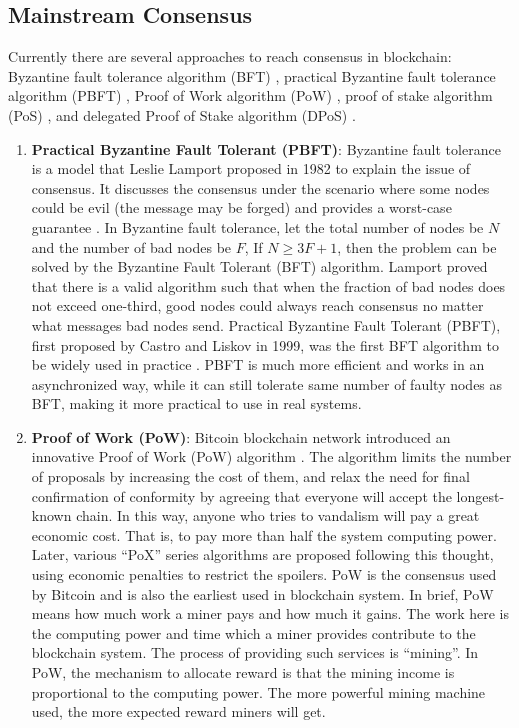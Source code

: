 \documentclass[reprint,pre,aps]{revtex4-1}
\begin{document}
\subsection{Mainstream Consensus}

Currently there are several approaches to reach consensus in blockchain: Byzantine fault tolerance algorithm (BFT) \cite{lamport1982byzantine}, practical Byzantine fault tolerance algorithm (PBFT) \cite{castro2002practical}, Proof of Work algorithm (PoW) \cite{nakamoto2008bitcoin}, proof of stake algorithm (PoS) \cite{vasin2014blackcoin, king2012ppcoin}, and delegated Proof of Stake algorithm (DPoS) \cite{dpos}.

\begin{enumerate}
\item \textbf{Practical Byzantine Fault Tolerant (PBFT)}: Byzantine fault tolerance is a model that Leslie Lamport proposed in 1982 to explain the issue of consensus. It discusses the consensus under the scenario where some nodes could be evil (the message may be forged) and provides a worst-case guarantee \cite{lamport1982byzantine}. In Byzantine fault tolerance, let the total number of nodes be $N$ and the number of bad nodes be $F$, If $N \geq 3F + 1$, then the problem can be solved by the Byzantine Fault Tolerant (BFT) algorithm. Lamport proved that there is a valid algorithm such that when the fraction of bad nodes does not exceed one-third, good nodes could always reach consensus no matter what messages bad nodes send. Practical Byzantine Fault Tolerant (PBFT), first proposed by Castro and Liskov in 1999, was the first BFT algorithm to be widely used in practice \cite{castro2002practical}. PBFT is much more efficient and works in an asynchronized way, while it can still tolerate same number of faulty nodes as BFT, making it more practical to use in real systems.
\item \textbf{Proof of Work (PoW)}: Bitcoin blockchain network introduced an innovative Proof of Work (PoW) algorithm \cite{nakamoto2008bitcoin}. The algorithm limits the number of proposals by increasing the cost of them, and relax the need for final confirmation of conformity by agreeing that everyone will accept the longest-known chain. In this way, anyone who tries to vandalism will pay a great economic cost. That is, to pay more than half the system computing power. Later, various ``PoX'' series algorithms are proposed following this thought, using economic penalties to restrict the spoilers. PoW is the consensus used by Bitcoin and is also the earliest used in blockchain system. In brief, PoW means how much work a miner pays and how much it gains. The work here is the computing power and time which a miner provides contribute to the blockchain system. The process of providing such services is ``mining''. In PoW, the mechanism to allocate reward is that the mining income is proportional to the computing power. The more powerful mining machine used, the more expected reward miners will get.

\end{enumerate}
\end{document}
